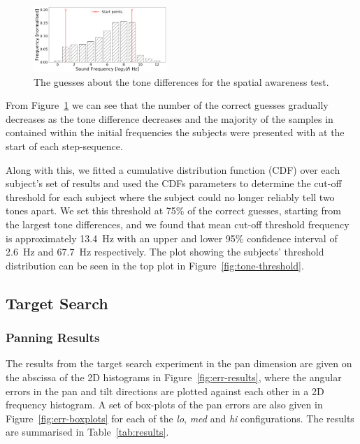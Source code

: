 \documentclass[format=sigconf, review=true, screen=true, anonymous=true]{acmart}
\begin{document}
\begin{figure}
  \centering
  \includegraphics[width=0.45\textwidth]{figures/tone_guesses.png}
  \caption{The guesses about the tone differences for the spatial awareness test.}
  \label{fig:tone-guesses}
\end{figure}

From Figure~\ref{fig:tone-guesses} we can see that the number of the correct guesses gradually decreases as the tone difference decreases and the majority of the samples in contained within the initial frequencies the subjects were presented with at the start of each step-sequence. 

Along with this, we fitted a cumulative distribution function (CDF) over each subject's set of results and used the CDFs parameters to determine the cut-off threshold for each subject where the subject could no longer reliably tell two tones apart. We set this threshold at 75\% of the correct guesses, starting from the largest tone differences, and we found that mean cut-off threshold frequency is approximately \SI{13.4}{\hertz} with an upper and lower 95\% confidence interval of \SI{2.6}{\hertz} and \SI{67.7}{\hertz} respectively. The plot showing the subjects' threshold distribution can be seen in the top plot in Figure~\ref{fig:tone-threshold}. 

\subsection{Target Search}

\subsubsection{Panning Results}

The results from the target search experiment in the pan dimension are given on the abscissa of the 2D histograms in Figure~\ref{fig:err-results}, where the angular errors in the pan and tilt directions are plotted against each other in a 2D frequency histogram. A set of box-plots of the pan errors are also given in Figure~\ref{fig:err-boxplots} for each of the \emph{lo}, \emph{med} and \emph{hi} configurations. The results are summarised in Table~\ref{tab:results}.
\end{document}
